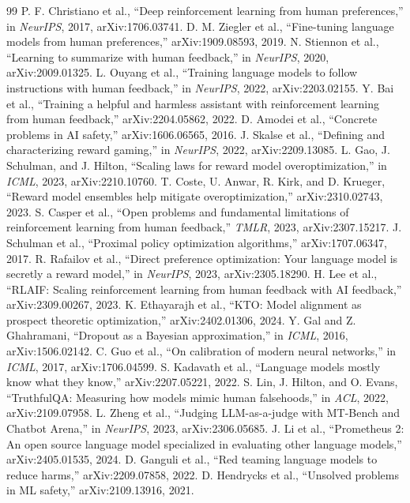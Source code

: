 \documentclass[twocolumn,10pt]{article}
\begin{document}
\clearpage
\begin{thebibliography}{99}
 P. F. Christiano et al., ``Deep reinforcement learning from human preferences,'' in \emph{NeurIPS}, 2017, arXiv:1706.03741.
 D. M. Ziegler et al., ``Fine-tuning language models from human preferences,'' arXiv:1909.08593, 2019.
 N. Stiennon et al., ``Learning to summarize with human feedback,'' in \emph{NeurIPS}, 2020, arXiv:2009.01325.
 L. Ouyang et al., ``Training language models to follow instructions with human feedback,'' in \emph{NeurIPS}, 2022, arXiv:2203.02155.
 Y. Bai et al., ``Training a helpful and harmless assistant with reinforcement learning from human feedback,'' arXiv:2204.05862, 2022.
 D. Amodei et al., ``Concrete problems in AI safety,'' arXiv:1606.06565, 2016.
 J. Skalse et al., ``Defining and characterizing reward gaming,'' in \emph{NeurIPS}, 2022, arXiv:2209.13085.
 L. Gao, J. Schulman, and J. Hilton, ``Scaling laws for reward model overoptimization,'' in \emph{ICML}, 2023, arXiv:2210.10760.
 T. Coste, U. Anwar, R. Kirk, and D. Krueger, ``Reward model ensembles help mitigate overoptimization,'' arXiv:2310.02743, 2023.
 S. Casper et al., ``Open problems and fundamental limitations of reinforcement learning from human feedback,'' \emph{TMLR}, 2023, arXiv:2307.15217.
 J. Schulman et al., ``Proximal policy optimization algorithms,'' arXiv:1707.06347, 2017.
 R. Rafailov et al., ``Direct preference optimization: Your language model is secretly a reward model,'' in \emph{NeurIPS}, 2023, arXiv:2305.18290.
 H. Lee et al., ``RLAIF: Scaling reinforcement learning from human feedback with AI feedback,'' arXiv:2309.00267, 2023.
 K. Ethayarajh et al., ``KTO: Model alignment as prospect theoretic optimization,'' arXiv:2402.01306, 2024.
 Y. Gal and Z. Ghahramani, ``Dropout as a Bayesian approximation,'' in \emph{ICML}, 2016, arXiv:1506.02142.
 C. Guo et al., ``On calibration of modern neural networks,'' in \emph{ICML}, 2017, arXiv:1706.04599.
 S. Kadavath et al., ``Language models mostly know what they know,'' arXiv:2207.05221, 2022.
 S. Lin, J. Hilton, and O. Evans, ``TruthfulQA: Measuring how models mimic human falsehoods,'' in \emph{ACL}, 2022, arXiv:2109.07958.
 L. Zheng et al., ``Judging LLM-as-a-judge with MT-Bench and Chatbot Arena,'' in \emph{NeurIPS}, 2023, arXiv:2306.05685.
 J. Li et al., ``Prometheus 2: An open source language model specialized in evaluating other language models,'' arXiv:2405.01535, 2024.
 D. Ganguli et al., ``Red teaming language models to reduce harms,'' arXiv:2209.07858, 2022.
 D. Hendrycks et al., ``Unsolved problems in ML safety,'' arXiv:2109.13916, 2021.
\end{thebibliography}
\end{document}
